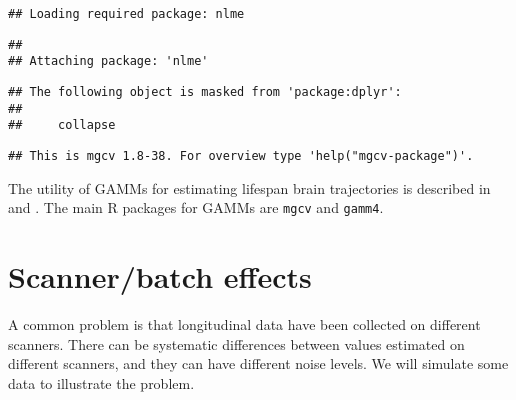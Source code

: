 \documentclass[
]{book}
\begin{document}
\begin{verbatim}
## Loading required package: nlme
\end{verbatim}

\begin{verbatim}
## 
## Attaching package: 'nlme'
\end{verbatim}

\begin{verbatim}
## The following object is masked from 'package:dplyr':
## 
##     collapse
\end{verbatim}

\begin{verbatim}
## This is mgcv 1.8-38. For overview type 'help("mgcv-package")'.
\end{verbatim}

The utility of GAMMs for estimating lifespan brain trajectories is described in \citet{fjell2010} and \citet{sorensen2021}. The main R packages for GAMMs are \texttt{mgcv} and \texttt{gamm4}.

\hypertarget{scannerbatch-effects}{%
\section{Scanner/batch effects}\label{scannerbatch-effects}}

A common problem is that longitudinal data have been collected on different scanners. There can be systematic differences between values estimated on different scanners, and they can have different noise levels. We will simulate some data to illustrate the problem.
\end{document}
